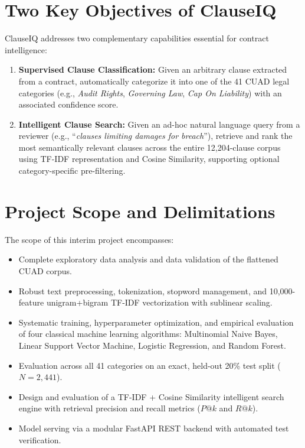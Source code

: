 \section*{Two Key Objectives of ClauseIQ}
\label{sec:two_key_objectives}
ClauseIQ addresses two complementary capabilities essential for contract intelligence:
\begin{enumerate}
    \item \textbf{Supervised Clause Classification:} Given an arbitrary clause extracted from a contract, automatically categorize it into one of the 41 CUAD legal categories (e.g., \textit{Audit Rights}, \textit{Governing Law}, \textit{Cap On Liability}) with an associated confidence score.
    \item \textbf{Intelligent Clause Search:} Given an ad-hoc natural language query from a reviewer (e.g., ``\textit{clauses limiting damages for breach}''), retrieve and rank the most semantically relevant clauses across the entire 12,204-clause corpus using TF-IDF representation and Cosine Similarity, supporting optional category-specific pre-filtering.
\end{enumerate}

\section*{Project Scope and Delimitations}
\label{sec:project_scope}
The scope of this interim project encompasses:
\begin{itemize}
    \item Complete exploratory data analysis and data validation of the flattened CUAD corpus.
    \item Robust text preprocessing, tokenization, stopword management, and 10,000-feature unigram+bigram TF-IDF vectorization with sublinear scaling.
    \item Systematic training, hyperparameter optimization, and empirical evaluation of four classical machine learning algorithms: Multinomial Naive Bayes, Linear Support Vector Machine, Logistic Regression, and Random Forest.
    \item Evaluation across all 41 categories on an exact, held-out 20\% test split ($N = 2,441$).
    \item Design and evaluation of a TF-IDF + Cosine Similarity intelligent search engine with retrieval precision and recall metrics ($P@k$ and $R@k$).
    \item Model serving via a modular FastAPI REST backend with automated test verification.
\end{itemize}

